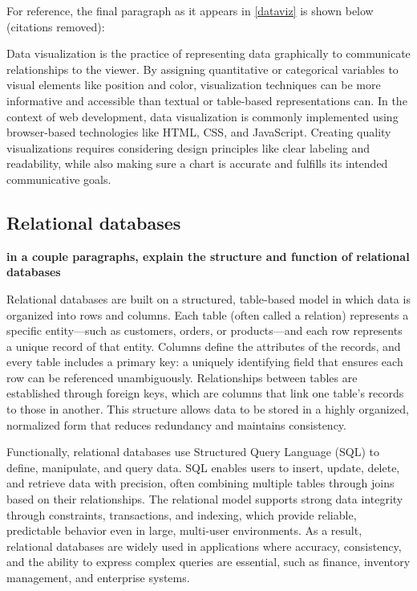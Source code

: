 For reference, the final paragraph as it appears in \autoref{dataviz} is shown below (citations removed):

\begin{singlespace}\small
Data visualization is the practice of representing data graphically to communicate relationships to the viewer. By assigning quantitative or categorical variables to visual elements like position and color, visualization techniques can be more informative and accessible than textual or table-based representations can. In the context of web development, data visualization is commonly implemented using browser-based technologies like HTML, CSS, and JavaScript. Creating quality visualizations requires considering design principles like clear labeling and readability, while also making sure a chart is accurate and fulfills its intended communicative goals.
\end{singlespace}

\subsection{Relational databases}

\begin{singlespace}\small
	\textbf{\textsf{in a couple paragraphs, explain the structure and function of relational databases}}
\end{singlespace}

\begin{singlespace}\small
	\textsf{Relational databases are built on a structured, table-based model in which data is organized into rows and columns. Each table (often called a relation) represents a specific entity—such as customers, orders, or products—and each row represents a unique record of that entity. Columns define the attributes of the records, and every table includes a primary key: a uniquely identifying field that ensures each row can be referenced unambiguously. Relationships between tables are established through foreign keys, which are columns that link one table’s records to those in another. This structure allows data to be stored in a highly organized, normalized form that reduces redundancy and maintains consistency.}
		
	\textsf{Functionally, relational databases use Structured Query Language (SQL) to define, manipulate, and query data. SQL enables users to insert, update, delete, and retrieve data with precision, often combining multiple tables through joins based on their relationships. The relational model supports strong data integrity through constraints, transactions, and indexing, which provide reliable, predictable behavior even in large, multi-user environments. As a result, relational databases are widely used in applications where accuracy, consistency, and the ability to express complex queries are essential, such as finance, inventory management, and enterprise systems.}
\end{singlespace}

